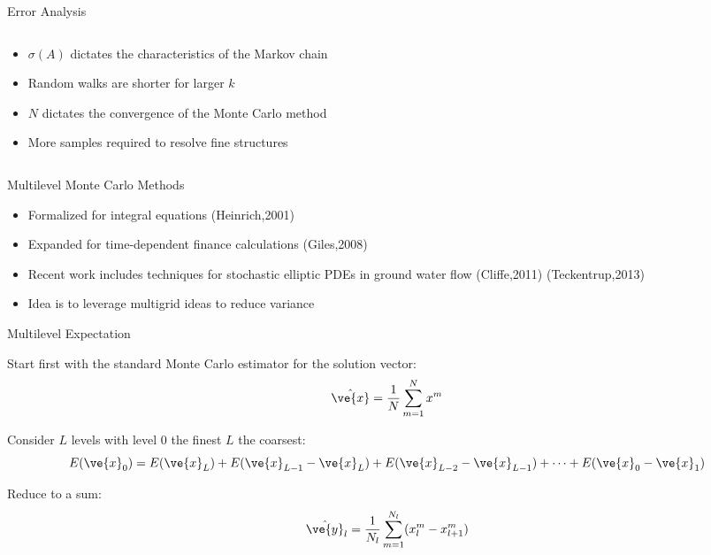 \documentclass{beamer}
\begin{document}
\begin{frame}{Error Analysis}
\begin{columns}
\begin{column}{0.7\textwidth}
      \vspace{-0.25in}

      \begin{itemize}
      \item $\sigma(A)$ dictates the characteristics of the Markov
        chain
        \smallskip
      \item Random walks are shorter for larger $k$
        \smallskip
      \item $N$ dictates the convergence of the Monte Carlo method
        \smallskip
      \item More samples required to resolve fine structures
      \end{itemize}

    \end{column}

  \end{columns}

\end{frame}

\begin{frame}{Multilevel Monte Carlo Methods}

  \begin{itemize}
  \item Formalized for integral equations (Heinrich,2001)
    \medskip
  \item Expanded for time-dependent finance calculations (Giles,2008)
    \medskip
  \item Recent work includes techniques for stochastic elliptic PDEs
    in ground water flow (Cliffe,2011) (Teckentrup,2013)
    \medskip
  \item Idea is to leverage multigrid ideas to reduce variance
  \end{itemize}

\end{frame}

\begin{frame}{Multilevel Expectation}

  Start first with the standard Monte Carlo estimator for the
  solution vector:
  \[
  \hat{\ve{x}} = \frac{1}{N} \sum_{m=1}^N x^m
  \]

  \medskip

  Consider $L$ levels with level 0 the finest $L$ the coarsest:
  \[
  E(\ve{x}_{0}) = E(\ve{x}_{L}) + E(\ve{x}_{L-1} - \ve{x}_{L}) +
  E(\ve{x}_{L-2} - \ve{x}_{L-1}) + \dots + E(\ve{x}_{0} - \ve{x}_{1})
  \]

  \medskip

  Reduce to a sum:
  \[
  \hat{\ve{y}}_{l} = \frac{1}{N_l} \sum_{m=1}^{N_l} (x^m_{l} -
  x^m_{l+1})
  \]

\end{frame}
\end{document}
